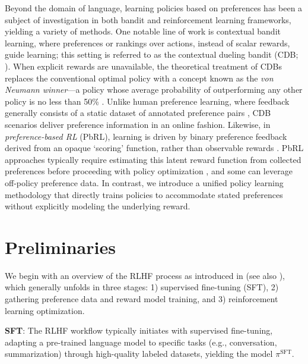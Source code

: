 Beyond the domain of language, learning policies based on preferences has been a subject of investigation in both bandit and reinforcement learning frameworks, yielding a variety of methods. One notable line of work is contextual bandit learning, where preferences or rankings over actions, instead of scalar rewards, guide learning; this setting is referred to as the contextual dueling bandit (CDB; \cite{yue2012karmed,dudik2015contextual}). When explicit rewards are unavailable, the theoretical treatment of CDBs replaces the conventional optimal policy with a concept known as the \textit{von Neumann winner}—a policy whose average probability of outperforming any other policy is no less than 50\% \citep{dudik2015contextual}. Unlike human preference learning, where feedback generally consists of a static dataset of annotated preference pairs \citep{yan2022human}, CDB scenarios deliver preference information in an online fashion. Likewise, in \textit{preference-based RL} (PbRL), learning is driven by binary preference feedback derived from an opaque ‘scoring’ function, rather than observable rewards \citep{BusaFekete2014,ruiz2023dueling}. PbRL approaches typically require estimating this latent reward function from collected preferences before proceeding with policy optimization \citep{jain2013learning,BusaFekete2014,christiano2017deep,sadigh2017active,kupcsik2018learning}, and some can leverage off-policy preference data. In contrast, we introduce a unified policy learning methodology that directly trains policies to accommodate stated preferences without explicitly modeling the underlying reward.

\section{Preliminaries}\label{section:prelims}

We begin with an overview of the RLHF process as introduced in \citeauthor{ziegler2020finetuning} (see also \citep{stiennon2022learning, bai2022training, ouyang2022training}), which generally unfolds in three stages: 1) supervised fine-tuning (SFT), 2) gathering preference data and reward model training, and 3) reinforcement learning optimization.

\textbf{SFT}: The RLHF workflow typically initiates with supervised fine-tuning, adapting a pre-trained language model to specific tasks (e.g., conversation, summarization) through high-quality labeled datasets, yielding the model $\pi^\text{SFT}$.

